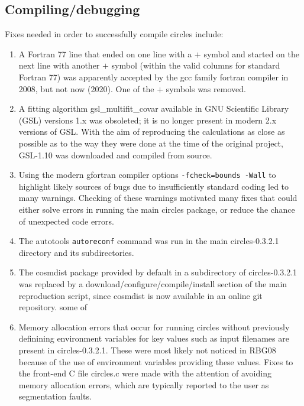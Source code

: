\subsection{Compiling/debugging}

Fixes needed in order to successfully compile {\sc circles} include:
\begin{enumerate}
\item
  A Fortran 77 line that ended on one line with a $+$ symbol and
  started on the next line with another $+$ symbol (within the valid
  columns for standard Fortran 77) was apparently accepted by the {\sc
    gcc} family fortran compiler in 2008, but not now (2020). One of
  the $+$ symbols was removed.
\item
  A fitting algorithm {\sc gsl\_multifit\_covar} available in GNU
  Scientific Library ({\sc GSL}) versions 1.x was obsoleted; it is no
  longer present in modern 2.x versions of {\sc GSL}. With the aim of
  reproducing the calculations as close as possible as to the way they
  were done at the time of the original project, {\sc GSL-1.10} was
  downloaded and compiled from source.
\item
  Using the modern {\sc gfortran} compiler options {\tt -fcheck=bounds
    -Wall} to highlight likely sources of bugs due to insufficiently
  standard coding led to many warnings.
  Checking of these warnings motivated many fixes that could either
  solve errors in running the main {\sc circles} package, or reduce
  the chance of unexpected code errors.
\item
  The autotools {\tt autoreconf} command was run in the main {\sc
    circles-0.3.2.1} directory and its subdirectories.
\item
  The {\sc cosmdist} package provided by default in a subdirectory of
  {\sc circles-0.3.2.1} was replaced by a
  download/configure/compile/install section of the main reproduction
  script, since {\sc cosmdist} is now available in an online
  git repository.
  some of
\item
  Memory allocation errors that occur for running {\sc circles}
  without previously definining environment variables for key
  values such as input filenames are present in {\sc
    circles-0.3.2.1}. These were most likely not noticed in RBG08
  because of the use of environment variables providing these
  values. Fixes to the front-end C file {\sc circles.c} were
  made with the attention of avoiding memory allocation errors,
  which are typically reported to the user as segmentation faults.
\end{enumerate}


